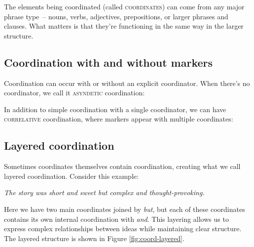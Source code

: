 The elements being coordinated (called \textsc{coordinates}) can come from any major phrase type~-- nouns, verbs, adjectives, prepositions, or larger phrases and clauses. What matters is that they're functioning in the same way in the larger structure.

\subsection{Coordination with and without markers}

Coordination can occur with or without an explicit coordinator. When there's no coordinator, we call it \textsc{asyndetic} coordination:

\ea \label{ex:coord-marking}
    \z
\z

In addition to simple coordination with a single coordinator, we can have \textsc{correlative} coordination, where markers appear with multiple coordinates:

\ea \label{ex:coord-correlative}
    \z
\z

\subsection{Layered coordination}

Sometimes coordinates themselves contain coordination, creating what we call layered coordination. Consider this example:

\ea \label{ex:coord-layered}
\textit{The story was {\ob}short and sweet{\cb} but {\ob}complex and thought-provoking{\cb}.}
\z

Here we have two main coordinates joined by \textit{but}, but each of these coordinates contains its own internal coordination with \textit{and}. This layering allows us to express complex relationships between ideas while maintaining clear structure. The layered structure is shown in Figure \ref{fig:coord-layered}.

